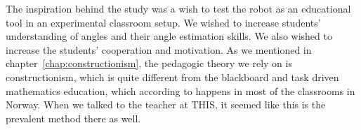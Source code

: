 The inspiration behind the study was a wish to test the robot as an educational tool in an experimental classroom setup. We wished to increase students' understanding of angles and their angle estimation skills. We also wished to increase the students' cooperation and motivation. As we mentioned in chapter~\ref{chap:constructionism}, the pedagogic theory we rely on is constructionism, which is quite different from the blackboard and task driven mathematics education, which according to  happens in most of the classrooms in Norway. When we talked to the teacher at THIS, it seemed like this is the prevalent method there as well. 





